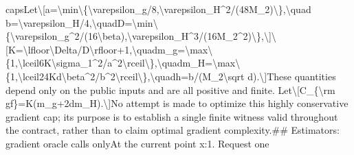\documentclass[10pt,a4paper]{article}
\begin{document}
caps\newline{}\newline{}Let\newline{}\newline{}\textbackslash{}[\newline{}a=\allowbreak{}\textbackslash{}min\textbackslash{}\{\textbackslash{}varepsilon\_\allowbreak{}g/\allowbreak{}8,\allowbreak{}\textbackslash{}varepsilon\_\allowbreak{}H\textasciicircum{}2/\allowbreak{}(48M\_\allowbreak{}2)\textbackslash{}\},\allowbreak{}\textbackslash{}quad b=\allowbreak{}\textbackslash{}varepsilon\_\allowbreak{}H/\allowbreak{}4,\allowbreak{}\textbackslash{}quad\newline{}D=\allowbreak{}\textbackslash{}min\textbackslash{}\{\textbackslash{}varepsilon\_\allowbreak{}g\textasciicircum{}2/\allowbreak{}(16\textbackslash{}beta),\allowbreak{}\textbackslash{}varepsilon\_\allowbreak{}H\textasciicircum{}3/\allowbreak{}(16M\_\allowbreak{}2\textasciicircum{}2)\textbackslash{}\},\allowbreak{}\newline{}\textbackslash{}]\newline{}\textbackslash{}[\newline{}K=\allowbreak{}\textbackslash{}lfloor\textbackslash{}Delta/\allowbreak{}D\textbackslash{}rfloor+1,\allowbreak{}\textbackslash{}quad\newline{}m\_\allowbreak{}g=\allowbreak{}\textbackslash{}max\textbackslash{}\{1,\allowbreak{}\textbackslash{}lceil6K\textbackslash{}sigma\_\allowbreak{}1\textasciicircum{}2/\allowbreak{}a\textasciicircum{}2\textbackslash{}rceil\textbackslash{}\},\allowbreak{}\textbackslash{}quad\newline{}m\_\allowbreak{}H=\allowbreak{}\textbackslash{}max\textbackslash{}\{1,\allowbreak{}\textbackslash{}lceil24Kd\textbackslash{}beta\textasciicircum{}2/\allowbreak{}b\textasciicircum{}2\textbackslash{}rceil\textbackslash{}\},\allowbreak{}\textbackslash{}quad\newline{}h=\allowbreak{}b/\allowbreak{}(M\_\allowbreak{}2\textbackslash{}sqrt d).\newline{}\textbackslash{}]\newline{}\newline{}These quantities depend only on the public inputs and are all positive and finite. Let\newline{}\textbackslash{}[\newline{}C\_\allowbreak{}\{\textbackslash{}rm gf\}=\allowbreak{}K(m\_\allowbreak{}g+2dm\_\allowbreak{}H).\newline{}\textbackslash{}]\newline{}No attempt is made to optimize this highly conservative gradient cap;\allowbreak{} its purpose is to establish a single finite witness valid throughout the contract,\allowbreak{} rather than to claim optimal gradient complexity.\newline{}\newline{}\#\# Estimators:\allowbreak{} gradient oracle calls only\newline{}\newline{}At the current point x:\allowbreak{}\newline{}\newline{}1. Request one 
\end{document}
